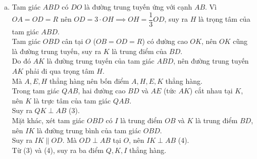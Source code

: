 \begin{bt}
{\begin{enumerate}[a)]
	Mặt khác, tam giác $OCD$ vuông cân tại $O$ ($OC = OD = R$) nên $\widehat{CDB} = 45^\circ$.\\
	Suy ra $\widehat{CEB} = \widehat{CDB} = 45^\circ$ (cùng chắn cung $CB$).\\
	Vì $\widehat{AEB} = 90^\circ$ nên $\widehat{AEI} = 90^\circ - \widehat{IEB} = 90^\circ - 45^\circ = 45^\circ$.\\
	Suy ra $\widehat{AEI} = \widehat{IEB} = 45^\circ$, tức là $EI$ là tia phân giác của góc $\widehat{AEB}$ trong $\Delta AEB$.\\
	Áp dụng tính chất đường phân giác:
	$$\dfrac{EA}{EB} = \dfrac{IA}{IB} = 3\text{ (theo (1))}.$$
	Từ $\Delta AOH \backsim \Delta AEB$, ta có $\dfrac{OA}{OH} = \dfrac{AE}{EB} = 3 \implies OA = 3 \cdot OH$.
	\item Tam giác $ABD$ có $DO$ là đường trung tuyến ứng với cạnh $AB$. Vì $OA = OD = R$ nên $OD = 3 \cdot OH \implies OH = \dfrac{1}{3}OD$, suy ra $H$ là trọng tâm của tam giác $ABD$.\\
	Tam giác $OBD$ cân tại $O$ ($OB = OD = R$) có đường cao $OK$, nên $OK$ cũng là đường trung tuyến, suy ra $K$ là trung điểm của $BD$.\\
	Do đó $AK$ là đường trung tuyến của tam giác $ABD$, nên đường trung tuyến $AK$ phải đi qua trọng tâm $H$.\\
	Mà $A, E, H$ thẳng hàng nên bốn điểm $A, H, E, K$ thẳng hàng.\\
	Trong tam giác $QAB$, hai đường cao $BD$ và $AE$ (tức $AK$) cắt nhau tại $K$, nên $K$ là trực tâm của tam giác $QAB$.\\
	Suy ra $QK \perp AB$ (3).\\
	Mặt khác, xét tam giác $OBD$ có $I$ là trung điểm $OB$ và $K$ là trung điểm $BD$, nên $IK$ là đường trung bình của tam giác $OBD$.\\
	Suy ra $IK \parallel OD$. Mà $OD \perp AB$ tại $O$, nên $IK \perp AB$ (4).\\
	Từ (3) và (4), suy ra ba điểm $Q, K, I$ thẳng hàng.
\end{enumerate}
}
\end{bt}



